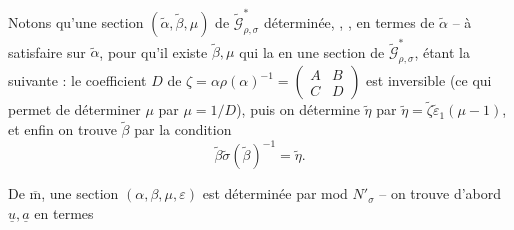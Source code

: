 
\uline{} Notons qu'une section $(\widetilde\alpha,\widetilde\beta,\mu)$
\deleted{\unsure{$\in\Gamma$}} de $\widetilde{\mathcal G}^{*}_{\rho,\sigma}$
  déterminée,
,
  , en termes de $\widetilde\alpha$ --
 à satisfaire sur $\widetilde\alpha$, pour
qu'il existe $\widetilde\beta,\mu$  qui la
 en une section de $\widetilde{\mathcal G}^{*}_{\rho,\sigma}$,
étant la suivante : le coefficient $D$ de
$\zeta=\alpha\rho(\alpha)^{-1}=\begin{pmatrix}A&B\\C&D\end{pmatrix}$
est inversible (ce qui permet de déterminer $\mu$ par $\mu=1/D$), puis
on détermine $\widetilde\eta$  par
$\widetilde\eta=\widetilde\zeta\widetilde\varepsilon_1(\mu-1)$, et
 enfin on trouve  $\widetilde\beta$ 
par la condition
\[
\widetilde\beta\widetilde\sigma(\widetilde\beta)^{-1}=\widetilde\eta.
\]



De $\overline{\mathrm m}$, une section $(\alpha,\beta,\mu,\varepsilon)$
est déterminée par 
 mod
 $N'_\sigma$ -- on trouve d'abord
$\underline u,\underline a$ en termes


